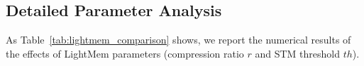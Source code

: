 % 

\subsection{Detailed Parameter Analysis}
\label{lightmem_results}
As Table~\ref{tab:lightmem_comparison} shows, we report the numerical results of the effects of LightMem parameters (compression ratio $r$ and STM threshold $th$).


